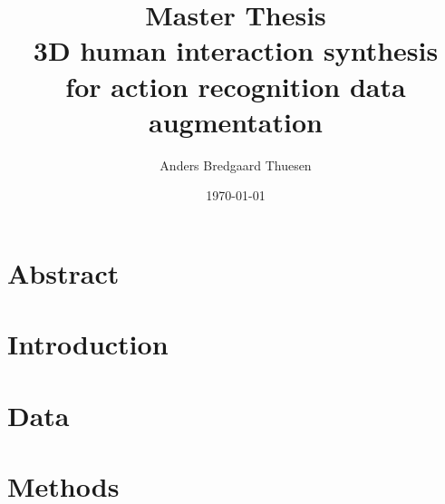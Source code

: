 \documentclass[options]{report}
\title{{\large Master Thesis} \\ 3D human interaction synthesis \\ for action recognition data augmentation}
\author{Anders Bredgaard Thuesen}
\date{\today}
\begin{document}
\maketitle

\section*{Abstract}

\section*{Introduction}


\section*{Data}


\section*{Methods}
\end{document}
